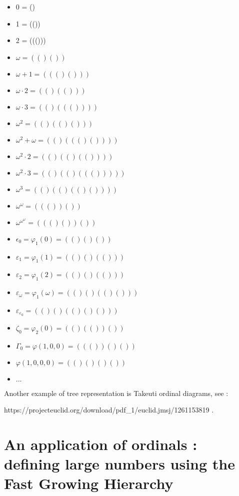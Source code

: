\documentclass[10pt]{article}
\begin{document}
\begin{itemize}
     \setlength{\itemsep}{1pt}
     \setlength{\parskip}{0pt}
     \setlength{\parsep}{0pt}

\item 0 = ()
\item 1 = (())
\item 2 = ((()))
\item \( \omega = (()()) \)
\item \( \omega+1 = ((()())) \)
\item \( \omega \cdot 2 = (()(())) \)
\item \( \omega \cdot 3 = (()((()))) \)
\item \( \omega^2 = (()(()())) \)
\item \( \omega^2+\omega = (()((()()))) \)
\item \( \omega^2 \cdot 2 = (()(()(()))) \)
\item \( \omega^2 \cdot 3 = (()(()((())))) \)
\item \( \omega^3 = (()(()(()()))) \)
\item \( \omega^\omega = ((())()) \)
\item \( \omega^{\omega^\omega} = ((()())()) \)
\item \( \epsilon_0 = \varphi_1(0) = (()()()) \)
\item \( \varepsilon_1 = \varphi_1(1) = (()()(())) \)
\item \( \varepsilon_2 = \varphi_1(2) = (()()(())) \)
\item \( \varepsilon_\omega = \varphi_1(\omega) = (()()(()())) \)
\item \( \varepsilon_{\varepsilon_0} = (()()(()()())) \) 
\item \( \zeta_0 = \varphi_2(0) = (()(())()) \)
\item \( \Gamma_0 = \varphi(1,0,0) = ((())()()) \)
\item \( \varphi(1,0,0,0) = (()()()()) \)
\item \( \ldots \)
\end{itemize}

Another example of tree representation is Takeuti ordinal diagrams, see :

 https://projecteuclid.org/download/pdf\_1/euclid.jmsj/1261153819 .

\section{An application of ordinals : defining large numbers using the Fast Growing Hierarchy}
\end{document}
